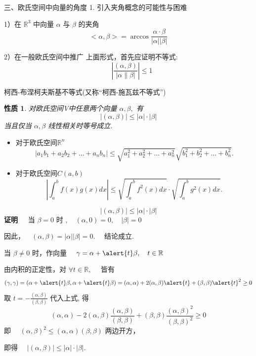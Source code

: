\documentclass[13pt]{beamer}
\newtheorem*{prop}{性质}
\def\pf{{\bf 证明~~ }}
\begin{document}
\begin{frame}{三、欧氏空间中向量的角度}
1. 引入夹角概念的可能性与困难

1）在 $\mathbb{R}^{3}$ 中向量 $\alpha$ 与 $\beta$ 的夹角
\[
<\alpha, \beta>=\arccos \frac{\alpha \cdot \beta}{|\alpha||\beta|}
\]

2）在一般欧氏空间中推广
上面形式，首先应证明不等式: 
$$\quad\left|\frac{ ( \alpha, \beta)}{|\alpha \| \beta|}\right| \leq 1$$
\end{frame}


\begin{frame}{柯西-布涅柯夫斯基不等式(又称``柯西-施瓦兹不等式'')}
\begin{prop}
对欧氏空间V中任意两个向量 $\alpha, \beta,$ 有
\[
| \left(\alpha, \beta \right) | \leq |\alpha|   \cdot | \beta|
\]
当且仅当 $\alpha, \beta$ 线性相关时等号成立.
\end{prop}

\begin{itemize}
\item 对于欧氏空间$\mathbb{R}^n$
$$\left|a_{1} b_{1}+a_{2} b_{2}+\dots+a_{n} b_{n}\right|
\leq \sqrt{a_{1}^{2}+a_{2}^{2}+\dots+a_{n}^{2}}   \sqrt{b_{1}^{2}+b_{2}^{2}+\dots+b_{n}^{2}}.$$
\item 对于欧氏空间$C(a,b)$
$$\left|\int_{a}^{b} f(x) g(x) d x\right| \leq \sqrt{\int_{a}^{b} f^{2}(x) d x}  \cdot  \sqrt{\int_{a}^{b} g^{2}(x) d x}.$$
\end{itemize}
\end{frame}

\begin{frame}
\[
|(\alpha, \beta)| \leq |\alpha|   \cdot | \beta|
\]
\pf
当 $\beta={0}$ 时 $, \quad(\alpha, {0})=0, \quad|\beta|=0$

因此，$ \quad(\alpha, \beta)=|\alpha||\beta|=0 . \quad$ 结论成立.

当 $\beta \neq {0}$ 时，作向量 $\quad \gamma=\alpha+ \alert{t} \beta, \quad t  \in \mathbb{R}$

由内积的正定性，对 $\forall t \in \mathbb{R}, \quad$ 皆有
$$(\gamma, \gamma)=(\alpha+ \alert{t} \beta, \alpha+\alert{t} \beta)
=(\alpha, \alpha)+2(\alpha, \beta) \alert{t}+(\beta, \beta) \alert{t}^{2} \geq 0 $$
取 $t=-\frac{(\alpha, \beta)}{(\beta, \beta)} $
 代入上式, 得  
$$(\alpha, \alpha)-2(\alpha, \beta) \frac{(\alpha, \beta)}{(\beta, \beta)}+(\beta, \beta) \frac{(\alpha, \beta)^{2}}{(\beta, \beta)^{2}} \geq 0$$
即 $\quad(\alpha, \beta)^{2} \leq(\alpha, \alpha)(\beta, \beta)$
两边开方，

即得 $\quad|(\alpha, \beta)| \leq|\alpha|  \cdot| \beta|.$
\end{frame}
\end{document}
